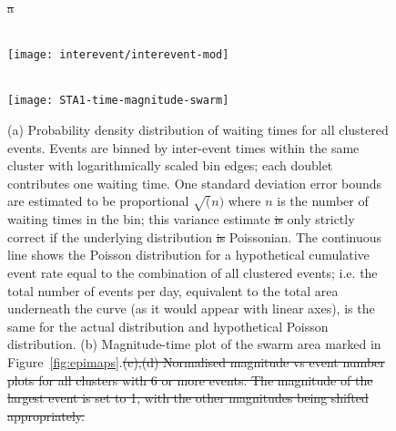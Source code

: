 \documentclass[reviewcopy]{elsart}
\renewcommand{\includegraphics}[2][]{\fbox{#2}}
\providecommand{\DIFadd}[1]{{\protect\color{blue}\uwave{#1}}} %
\providecommand{\DIFdel}[1]{{\protect\color{red}\sout{#1}}}                      %
\providecommand{\DIFaddFL}[1]{\DIFadd{#1}} %
\providecommand{\DIFdelFL}[1]{\DIFdel{#1}} %
\providecommand{\DIFaddbeginFL}{} %
\providecommand{\DIFaddendFL}{} %
\providecommand{\DIFdelbeginFL}{} %
\providecommand{\DIFdelendFL}{} %
\begin{document}
\begin{figure}
\DIFdelbeginFL %
\DIFdelFL{a}%
\DIFdelendFL \DIFaddbeginFL \centering 
\DIFaddendFL 

\DIFdelbeginFL %
\DIFdelendFL \DIFaddbeginFL \parbox{0.65\textwidth}{{\sf \bf \DIFaddFL{a}}  \\
\texttt{[image: interevent/interevent-mod]}}

\parbox{0.65\textwidth}{{\sf \bf \DIFaddFL{b}}  \\
\texttt{[image: STA1-time-magnitude-swarm]}}



\DIFaddendFL \caption{(a) Probability density distribution of waiting  times for all clustered events.  Events are binned by
inter-event times within the same cluster with logarithmically scaled
bin edges; each doublet
contributes one waiting time. One standard deviation error bounds are
estimated to be proportional \DIFdelbeginFL \DIFdelFL{$\sqrt(n)$ }\DIFdelendFL \DIFaddbeginFL \DIFaddFL{$\sqrt{n}$ }\DIFaddendFL where $n$ is the number of
waiting times in the bin; this variance estimate \DIFdelbeginFL \DIFdelFL{is }\DIFdelendFL \DIFaddbeginFL \DIFaddFL{would }\DIFaddendFL only \DIFaddbeginFL \DIFaddFL{be }\DIFaddendFL strictly
correct if the underlying distribution \DIFdelbeginFL \DIFdelFL{is }\DIFdelendFL \DIFaddbeginFL \DIFaddFL{were }\DIFaddendFL Poissonian.  The continuous
line shows the Poisson distribution for a hypothetical cumulative
event rate equal to the combination of all clustered events; i.e. the
total number of events per day, equivalent to the total area underneath the
curve (as it would appear with linear axes), is the same for the
actual distribution and hypothetical Poisson distribution. (b)
Magnitude-time plot of the swarm area marked in
Figure~\ref{fig:epimaps}.\DIFdelbeginFL \DIFdelFL{(c),(d) Normalised magnitude vs event number
plots for all clusters with 6 or more events. The magnitude of the
largest event is set to 1, with the other magnitudes being shifted appropriately.}\DIFdelendFL }
\label{fig:clust-statistics}
\end{figure}
\end{document}
